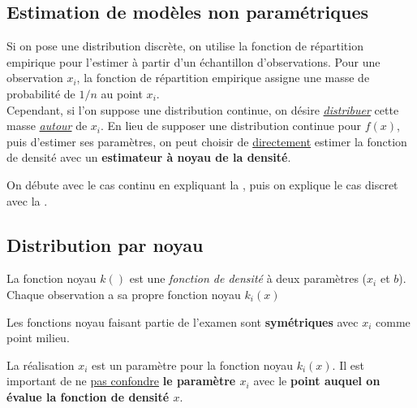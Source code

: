 \documentclass[10pt, french]{article}
\begin{document}
\begin{multicols*}{2}
\pagebreak
\section{Estimation de modèles non paramétriques}
\begin{rappel_enhanced}[Contexte]
Si on pose une distribution discrète, on utilise la fonction de répartition empirique pour l'estimer à partir d'un échantillon d'observations. Pour une observation $x_{i}$, la fonction de répartition empirique assigne une masse de probabilité de $1/n$ au point $x_{i}$. \\

Cependant, si l'on suppose une distribution continue, on désire \underline{\textit{distribuer}} cette masse \textit{\underline{autour}} de $x_{i}$. En lieu de supposer une distribution continue pour $f(x)$, puis d'estimer ses paramètres, on peut choisir de \underline{directement} estimer la fonction de densité avec un \textbf{estimateur à noyau de la densité}.
\end{rappel_enhanced}


On débute avec le cas continu en expliquant la \underline{\textit{}}, puis on explique le cas discret avec la \underline{\textit{}}.


\columnbreak
\subsection{Distribution par noyau}\label{subsec:kernelDistr}
\begin{definitionNOHFILL}
La fonction noyau $k()$ est une \textit{fonction de densité} à deux paramètres ($x_{i}$ et $b$).	Chaque observation a sa propre fonction noyau $k_{i}(x)$\\

\begin{rappel_enhanced}[Contexte]
Les fonctions noyau faisant partie de l'examen sont \textbf{symétriques} avec $x_{i}$ comme point milieu. 
\end{rappel_enhanced}
\end{definitionNOHFILL}

\begin{definitionNOHFILLsub}
La réalisation $x_{i}$ est un paramètre pour la fonction noyau $k_{i}(x)$. Il est important de ne \underline{pas confondre} \textbf{le paramètre $x_{i}$} avec le \textbf{point auquel on évalue la fonction de densité $x$}.


\end{definitionNOHFILLsub}
\end{multicols*}
\end{document}
